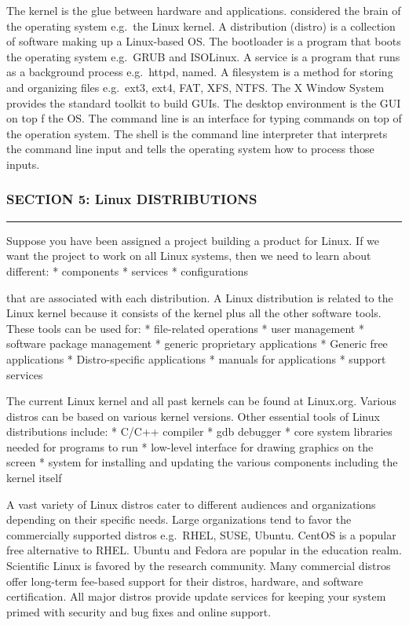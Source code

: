 The kernel is the glue between hardware and applications. considered the
brain of the operating system e.g.~the Linux kernel. A distribution
(distro) is a collection of software making up a Linux-based OS. The
bootloader is a program that boots the operating system e.g.~GRUB and
ISOLinux. A service is a program that runs as a background process
e.g.~httpd, named. A filesystem is a method for storing and organizing
files e.g.~ext3, ext4, FAT, XFS, NTFS. The X Window System provides the
standard toolkit to build GUIs. The desktop environment is the GUI on
top f the OS. The command line is an interface for typing commands on
top of the operation system. The shell is the command line interpreter
that interprets the command line input and tells the operating system
how to process those inputs.

\subsubsection{SECTION 5: Linux
DISTRIBUTIONS}\label{section-5-linux-distributions}

\begin{center}\rule{3in}{0.4pt}\end{center}

Suppose you have been assigned a project building a product for Linux.
If we want the project to work on all Linux systems, then we need to
learn about different: * components * services * configurations

that are associated with each distribution. A Linux distribution is
related to the Linux kernel because it consists of the kernel plus all
the other software tools. These tools can be used for: * file-related
operations * user management * software package management * generic
proprietary applications * Generic free applications * Distro-specific
applications * manuals for applications * support services

The current Linux kernel and all past kernels can be found at Linux.org.
Various distros can be based on various kernel versions. Other essential
tools of Linux distributions include: * C/C++ compiler * gdb debugger *
core system libraries needed for programs to run * low-level interface
for drawing graphics on the screen * system for installing and updating
the various components including the kernel itself

A vast variety of Linux distros cater to different audiences and
organizations depending on their specific needs. Large organizations
tend to favor the commercially supported distros e.g.~RHEL, SUSE,
Ubuntu. CentOS is a popular free alternative to RHEL. Ubuntu and Fedora
are popular in the education realm. Scientific Linux is favored by the
research community. Many commercial distros offer long-term fee-based
support for their distros, hardware, and software certification. All
major distros provide update services for keeping your system primed
with security and bug fixes and online support.


